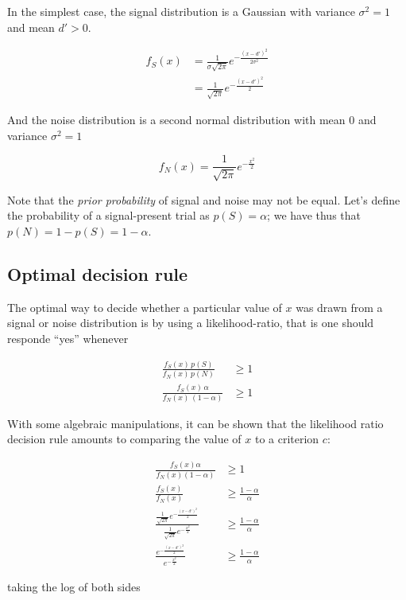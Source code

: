 \documentclass[
]{book}
\begin{document}
In the simplest case, the signal distribution is a Gaussian with variance \(\sigma^2=1\) and mean \(d'>0\).

\[
\begin{aligned}
f_S(x)&=\frac{1}{\sigma\sqrt{2 \pi}} e^{-\frac{(x-d')^2}{2 \sigma^2}}\\
&=\frac{1}{\sqrt{2 \pi}} e^{-\frac{(x-d')^2}{2}}
\end{aligned}
\]

And the noise distribution is a second normal distribution with mean \(0\) and variance \(\sigma^2=1\)

\[
f_N(x)=\frac{1}{\sqrt{2 \pi}} e^{-\frac{x^2}{2}}
\]

Note that the \emph{prior probability} of signal and noise may not be equal. Let's define the probability of a signal-present trial as \(p(S)=\alpha\); we have thus that \(p(N)=1-p(S)=1-\alpha\).

\subsection{Optimal decision rule}\label{optimal-decision-rule}

The optimal way to decide whether a particular value of \(x\) was drawn from a signal or noise distribution is by using a likelihood-ratio, that is one should responde ``yes'' whenever

\[
\begin{aligned}
\frac{f_S(x)\,p(S)}{f_N(x) \, p(N)} & \ge 1 \\
\frac{f_S(x)\,\alpha}{f_N(x) \, (1-\alpha)} & \ge 1 
\end{aligned}
\]

With some algebraic manipulations, it can be shown that the likelihood ratio decision rule amounts to comparing the value of \(x\) to a criterion \(c\):

\[
\begin{aligned}
\frac{f_S(x)\alpha}{f_N(x)(1-\alpha)} & \ge 1 \\
\frac{f_S(x)}{f_N(x)} & \ge \frac{1-\alpha}{\alpha} \\
\frac{\frac{1}{\sqrt{2 \pi}} e^{-\frac{(x-d')^2}{2}}}{\frac{1}{\sqrt{2 \pi}} e^{-\frac{x^2}{2}}} & \ge \frac{1-\alpha}{\alpha} \\
\frac{e^{-\frac{(x-d')^2}{2}}}{e^{-\frac{x^2}{2}}} & \ge \frac{1-\alpha}{\alpha} 
\end{aligned}
\]

taking the log of both sides
\end{document}
